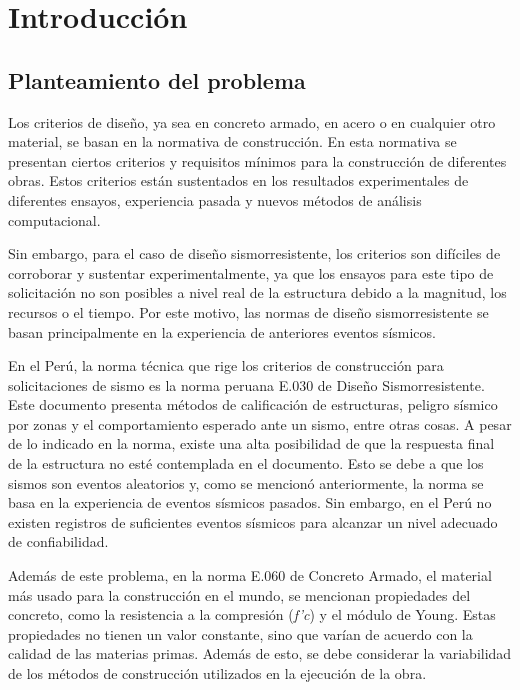 \chapter{Introducción}

\section{Planteamiento del problema}
Los criterios de diseño, ya sea en concreto armado, en acero o en cualquier otro material, se basan en la normativa de construcción. En esta normativa se presentan ciertos criterios y requisitos mínimos para la construcción de diferentes obras. Estos criterios están sustentados en los resultados experimentales de diferentes ensayos, experiencia pasada y nuevos métodos de análisis computacional. 

Sin embargo, para el caso de diseño sismorresistente, los criterios son difíciles de corroborar y sustentar experimentalmente, ya que los ensayos para este tipo de solicitación no son posibles a nivel real de la estructura debido a la magnitud, los recursos o el tiempo. Por este motivo, las normas de diseño sismorresistente se basan principalmente en la experiencia de anteriores eventos sísmicos.

En el Perú, la norma técnica que rige los criterios de construcción para solicitaciones de sismo es la norma peruana E.030 de Diseño Sismorresistente. Este documento presenta métodos de calificación de estructuras, peligro sísmico por zonas y el comportamiento esperado ante un sismo, entre otras cosas. A pesar de lo indicado en la norma, existe una alta posibilidad de que la respuesta final de la estructura no esté contemplada en el documento. Esto se debe a que los sismos son eventos aleatorios y, como se mencionó anteriormente, la norma se basa en la experiencia de eventos sísmicos pasados. Sin embargo, en el Perú no existen registros de suficientes eventos sísmicos para alcanzar un nivel adecuado de confiabilidad.

Además de este problema, en la norma E.060 de Concreto Armado, el material más usado para la construcción en el mundo, se mencionan propiedades del concreto, como la resistencia a la compresión (\textit{f'c}) y el módulo de Young. Estas propiedades no tienen un valor constante, sino que varían de acuerdo con la calidad de las materias primas. Además de esto, se debe considerar la variabilidad de los métodos de construcción utilizados en la ejecución de la obra. 

